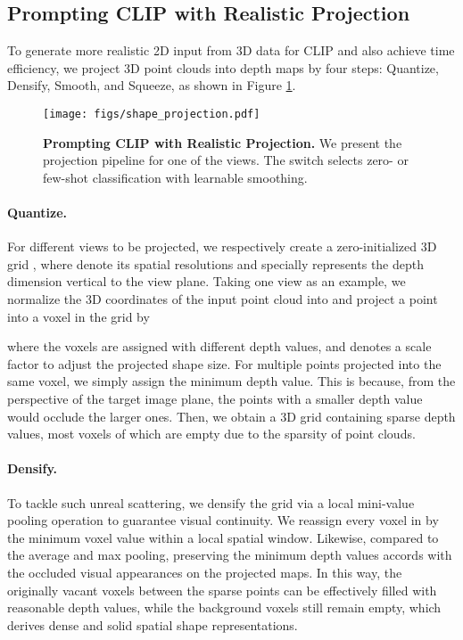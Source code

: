 \documentclass[10pt,twocolumn,letterpaper]{article}
\begin{document}
\subsection{Prompting CLIP with Realistic Projection}
\label{method:shape_projection}

To generate more realistic 2D input from 3D data for CLIP and also achieve time efficiency, we project 3D point clouds into depth maps by four steps: Quantize, Densify, Smooth, and Squeeze, as shown in Figure \ref{fig:shape_projection}.

\begin{figure}[t!]
\centering
\texttt{[image: figs/shape\_projection.pdf]}
\vspace{0.19cm}
\caption{\textbf{Prompting CLIP with Realistic Projection.} We present the projection pipeline for one of the views. The switch selects zero- or few-shot classification with learnable smoothing.}
\label{fig:shape_projection}
\vspace{-0.1cm}
\end{figure}

\vspace{-6pt}
\paragraph{Quantize.} 
For different  views to be projected, we respectively create a zero-initialized 3D grid , where  denote its spatial resolutions and  specially represents the depth dimension vertical to the view plane.
Taking one view as an example, we normalize the 3D coordinates of the input point cloud into  and project a point  into a voxel in the grid by

where the voxels are assigned with different depth values, and  denotes a scale factor to adjust the projected shape size. For multiple points projected into the same voxel, we simply assign the minimum depth value. This is because, from the perspective of the target image plane, the points with a smaller depth value  would occlude the larger ones.
Then, we obtain a 3D grid  containing sparse depth values, most voxels of which are empty due to the sparsity of point clouds.

\vspace{-6pt}
\paragraph{Densify.} 
To tackle such unreal scattering, we densify the grid via a local mini-value pooling operation to guarantee visual continuity. We reassign every voxel in  by the minimum voxel value within a local spatial window. Likewise, compared to the average and max pooling, preserving the minimum depth values accords with the occluded visual appearances on the projected maps. In this way, the originally vacant voxels between the sparse points can be effectively filled with reasonable depth values, while the background voxels still remain empty, which derives dense and solid spatial shape representations.
\end{document}
